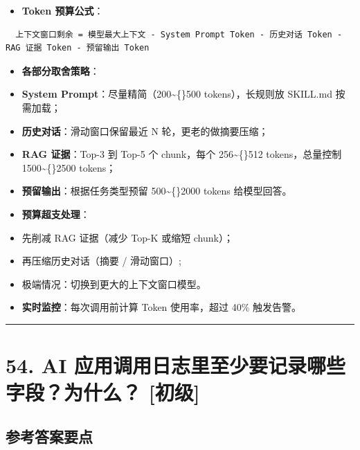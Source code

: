 \documentclass[9pt,a4paper,twocolumn]{ctexart}
\newcommand{\lvchu}{\usebox{\badgechubox}}
\def\lvchu{[初级]}%
\begin{document}
\begin{itemize}[itemsep=1pt, topsep=2pt]
  \item \textbf{Token 预算公式}：
\end{itemize}

\begin{lstlisting}
  上下文窗口剩余 = 模型最大上下文 - System Prompt Token - 历史对话 Token - RAG 证据 Token - 预留输出 Token
\end{lstlisting}

\begin{itemize}[itemsep=1pt, topsep=2pt]
  \item \textbf{各部分取舍策略}：
  \item \textbf{System Prompt}：尽量精简（200\textasciitilde\{\}500 tokens），长规则放 SKILL.md 按需加载；
  \item \textbf{历史对话}：滑动窗口保留最近 N 轮，更老的做摘要压缩；
  \item \textbf{RAG 证据}：Top-3 到 Top-5 个 chunk，每个 256\textasciitilde\{\}512 tokens，总量控制 1500\textasciitilde\{\}2500 tokens；
  \item \textbf{预留输出}：根据任务类型预留 500\textasciitilde\{\}2000 tokens 给模型回答。
  \item \textbf{预算超支处理}：
  \item 先削减 RAG 证据（减少 Top-K 或缩短 chunk）；
  \item 再压缩历史对话（摘要 / 滑动窗口）;
  \item 极端情况：切换到更大的上下文窗口模型。
  \item \textbf{实时监控}：每次调用前计算 Token 使用率，超过 40\% 触发告警。
\end{itemize}


\vspace{2pt}
\noindent\rule{\columnwidth}{0.3pt}\vspace{2pt}



\section*{54. AI 应用调用日志里至少要记录哪些字段？为什么？ \lvchu{}}


\subsection*{参考答案要点}
\end{document}
